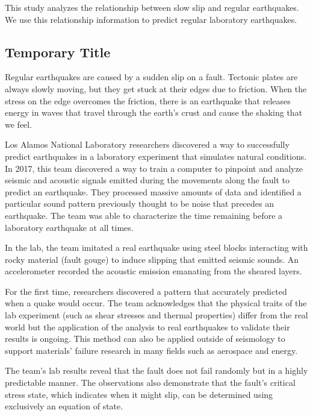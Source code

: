 \documentclass[]{llncs}
\begin{document}
This study analyzes the relationship between slow slip and regular earthquakes. We use this relationship information to predict regular laboratory earthquakes. \par
\subsection{Temporary Title}
Regular earthquakes are caused by a sudden slip on a fault. Tectonic plates are always slowly moving, but they get stuck at their edges due to friction. When the stress on the edge overcomes the friction, there is an earthquake that releases energy in waves that travel through the earth's crust and cause the shaking that we feel.\cite{USGSfaqs}\par

Los Alamos National Laboratory researchers discovered a way to successfully predict earthquakes in a laboratory experiment that simulates natural conditions. In 2017, this team discovered a way to train a computer to pinpoint and analyze seismic and acoustic signals emitted during the movements along the fault to predict an earthquake. They processed massive amounts of data and identified a particular sound pattern previously thought to be noise that precedes an earthquake. The team was able to characterize the time remaining before a laboratory earthquake at all times.\cite{LANLNews} \par
In the lab, the team imitated a real earthquake using steel blocks interacting with rocky material (fault gouge) to induce slipping that emitted seismic sounds. An accelerometer recorded the acoustic emission emanating from the sheared layers.\cite{LANLNews}\par

For the first time, researchers discovered a pattern that accurately predicted when a quake would occur. The team acknowledges that the physical traits of the lab experiment (such as shear stresses and thermal properties) differ from the real world but the application of the analysis to real earthquakes to validate their results is ongoing. This method can also be applied outside of seismology to support materials’ failure research in many fields such as aerospace and energy.\cite{LANLNews}\par

The team’s lab results reveal that the fault does not fail randomly but in a highly predictable manner. The observations also demonstrate that the fault’s critical stress state, which indicates when it might slip, can be determined using exclusively an equation of state.\cite{LANLNews}\par
\end{document}
